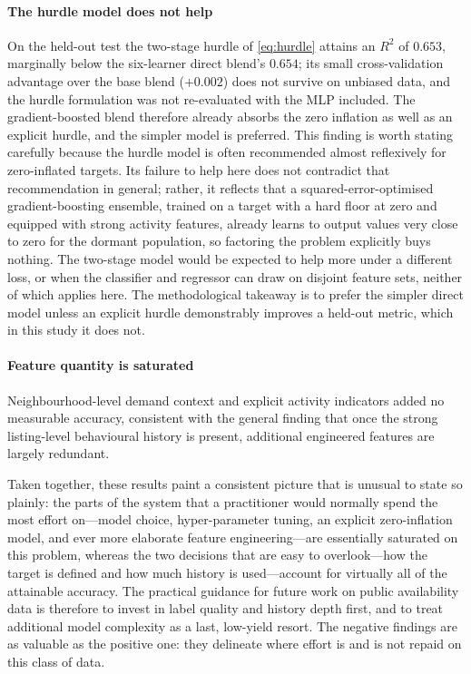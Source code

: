 \documentclass[journal]{IEEEtran}
\begin{document}
\paragraph{The hurdle model does not help}
On the held-out test the two-stage hurdle of \eqref{eq:hurdle} attains an $R^2$ of
$0.653$, marginally below the six-learner direct blend's $0.654$; its small
cross-validation advantage over the base blend ($+0.002$) does not survive on
unbiased data, and the hurdle formulation was not re-evaluated with the MLP
included. The gradient-boosted blend
therefore already absorbs the zero inflation as well as an explicit hurdle, and
the simpler model is preferred. This finding is worth stating carefully because the
hurdle model is often recommended almost reflexively for zero-inflated targets. Its
failure to help here does not contradict that recommendation in general; rather, it
reflects that a squared-error-optimised gradient-boosting ensemble, trained on a
target with a hard floor at zero and equipped with strong activity features, already
learns to output values very close to zero for the dormant population, so factoring
the problem explicitly buys nothing. The two-stage model would be expected to help
more under a different loss, or when the classifier and regressor can draw on
disjoint feature sets, neither of which applies here. The methodological takeaway is
to prefer the simpler direct model unless an explicit hurdle demonstrably improves a
held-out metric, which in this study it does not.

\paragraph{Feature quantity is saturated}
Neighbourhood-level demand context and explicit activity indicators added no
measurable accuracy, consistent with the general finding that once the strong
listing-level behavioural history is present, additional engineered features are
largely redundant.

Taken together, these results paint a consistent picture that is unusual to state
so plainly: the parts of the system that a practitioner would normally spend the
most effort on---model choice, hyper-parameter tuning, an explicit zero-inflation
model, and ever more elaborate feature engineering---are essentially saturated on
this problem, whereas the two decisions that are easy to overlook---how the target
is defined and how much history is used---account for virtually all of the
attainable accuracy. The practical guidance for future work on public
availability data is therefore to invest in label quality and history depth first,
and to treat additional model complexity as a last, low-yield resort. The negative
findings are as valuable as the positive one: they delineate where effort is and
is not repaid on this class of data.
\end{document}
